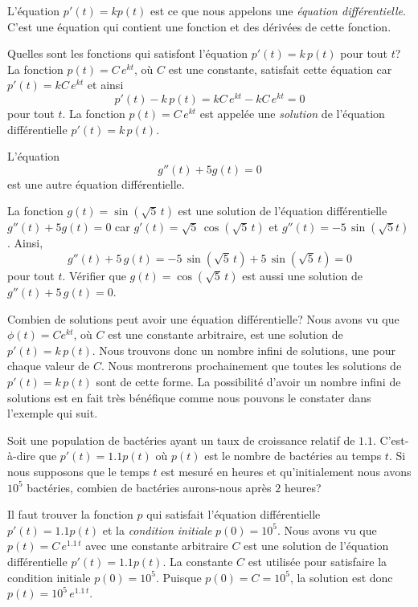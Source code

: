 {\begin{egg}[\life]
L'équation $p'(t) = k p(t)$ est ce que nous appelons une
{\em équation différentielle}.  C'est une équation qui contient une
fonction et des dérivées de cette fonction.

Quelles sont les fonctions qui satisfont l'équation $p'(t) = k\, p(t)$
pour tout $t$?  La fonction $p(t) = C\,e^{kt}$, où $C$ est une
constante, satisfait cette équation car $p'(t) = kC\,e^{kt}$ et ainsi
\[
p'(t) - k\,p(t) = kC\,e^{kt} - kC\,e^{kt} = 0
\]
pour tout $t$.  La fonction $p(t) = C\,e^{kt}$ est appelée une
{\em solution} de l'équation différentielle $p'(t) = k\, p(t)$.
\end{egg}

\begin{egg}
L'équation
\[
g''(t) + 5 g(t) = 0
\]
est une autre équation différentielle.

La fonction $g(t) = \sin(\sqrt{5}\,t)$ est une solution de
l'équation différentielle $g''(t) + 5 g(t) = 0$ car
$g'(t) = \sqrt{5}\,\cos(\sqrt{5}\,t)$ et
$g''(t) = -5\,\sin(\sqrt{5} t)$.  Ainsi,
\[
g''(t) + 5\,g(t) = - 5\,\sin(\sqrt{5}\, t) + 5\,\sin(\sqrt{5}\,t) = 0
\]
pour tout $t$.  Vérifier que $g(t) = \cos(\sqrt{5}\, t)$ est aussi
une solution de $g''(t) + 5\,g(t) = 0$.
\end{egg}

Combien de solutions peut avoir une équation différentielle?  Nous avons vu
que $\phi(t) = C e^{kt}$, où $C$ est une constante
arbitraire, est une solution de $p'(t) = k\,p(t)$.  Nous trouvons donc un
nombre infini de solutions, une pour chaque valeur de $C$.  Nous
montrerons prochainement que toutes les solutions de $p'(t) = k\,p(t)$
sont de cette forme.  La possibilité d'avoir un nombre infini de
solutions est en fait très bénéfique comme nous pouvons le constater dans
l'exemple qui suit.

\begin{egg}[\life]
Soit une population de bactéries ayant un taux de croissance relatif
de $1.1$.  C'est-à-dire que $\displaystyle p'(t) = 1.1 p(t)$ où $p(t)$
est le nombre de bactéries au temps $t$.   Si nous supposons que le temps
$t$ est mesuré en heures et qu'initialement nous avons $10^5$ bactéries,
combien de bactéries aurons-nous après $2$ heures?

Il faut trouver la fonction $p$ qui satisfait l'équation
différentielle $p'(t) = 1.1 p(t)$ et la
{\em condition initiale} $p(0)=10^5$.  Nous avons vu que
$p(t) = C\, e^{1.1\,t}$ avec une constante
arbitraire $C$ est une solution de l'équation différentielle
$p'(t) = 1.1 p(t)$.  La constante $C$ est utilisée pour satisfaire la
condition initiale $p(0) = 10^5$.  Puisque $p(0)= C = 10^5$, la
solution est donc $p(t) = 10^5 \,e^{1.1\,t}$.


\end{egg}}
